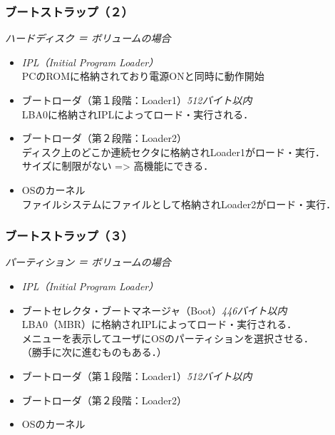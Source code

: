 \documentclass[unicode,handout]{beamer}                   %
\begin{document}
\begin{frame}
  \frametitle{ブートストラップ（２）}
  \emph{ハードディスク ＝ ボリュームの場合}
  \begin{itemize}
  \item \emph{IPL（Initial Program Loader）} \\
    \small{PCのROMに格納されており電源ONと同時に動作開始}
  \item ブートローダ（第１段階：Loader1）\emph{512バイト以内} \\
    \small{LBA0に格納されIPLによってロード・実行される．}
  \item ブートローダ（第２段階：Loader2） \\
    \small{ディスク上のどこか連続セクタに格納されLoader1がロード・実行．\\
      サイズに制限がない => 高機能にできる．}
  \item OSのカーネル \\
    \small{ファイルシステムにファイルとして格納されLoader2がロード・実行．}
  \end{itemize}
\end{frame}

\begin{frame}
  \frametitle{ブートストラップ（３）}
  \emph{パーティション ＝ ボリュームの場合}
  \begin{itemize}
  \item \emph{IPL（Initial Program Loader）}
  \item ブートセレクタ・ブートマネージャ（Boot）\emph{446バイト以内} \\
    \small{LBA0（MBR）に格納されIPLによってロード・実行される．\\
    メニューを表示してユーザにOSのパーティションを選択させる．\\
    （勝手に次に進むものもある．）}
  \item ブートローダ（第１段階：Loader1）\emph{512バイト以内} 
  \item ブートローダ（第２段階：Loader2）
  \item OSのカーネル
  \end{itemize}
\end{frame}
\end{document}
